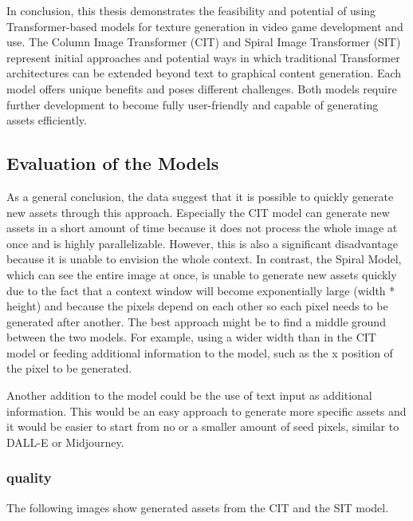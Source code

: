 
    In conclusion, this thesis demonstrates the feasibility and potential of using Transformer-based models for texture generation in video game development and use. The Column Image Transformer (CIT) and Spiral Image Transformer (SIT) represent initial approaches and potential ways in which traditional Transformer architectures can be extended beyond text to graphical content generation. Each model offers unique benefits and poses different challenges. Both models require further development to become fully user-friendly and capable of generating assets efficiently.

\subsection{Evaluation of the Models}

    As a general conclusion, the data suggest that it is possible to quickly generate new assets through this approach. Especially the CIT model can generate new assets in a short amount of time because it does not process the whole image at once and is highly parallelizable. However, this is also a significant disadvantage because it is unable to envision the whole context. In contrast, the Spiral Model, which can see the entire image at once, is unable to generate new assets quickly due to the fact that a context window will become exponentially large (width * height) and because the pixels depend on each other so each pixel needs to be generated after another. The best approach might be to find a middle ground between the two models. For example, using a wider width than in the CIT model or feeding additional information to the model, such as the x position of the pixel to be generated.

    Another addition to the model could be the use of text input as additional information. This would be an easy approach to generate more specific assets and it would be easier to start from no or a smaller amount of seed pixels, similar to DALL-E or Midjourney.

\subsubsection{quality}
    The following images show generated assets from the CIT and the SIT model.
    
    


